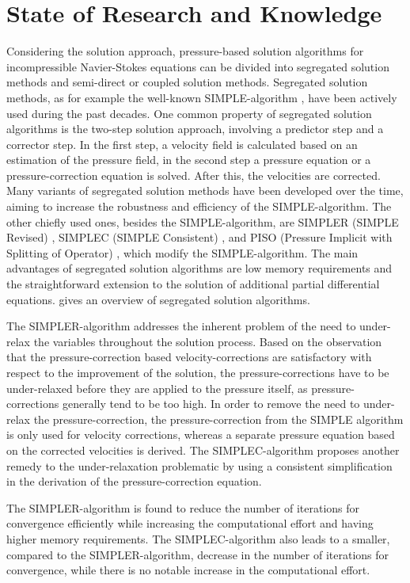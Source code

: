 \section{State of Research and Knowledge}

Considering the solution approach, pressure-based solution algorithms for incompressible Navier-Stokes equations can be divided into segregated solution methods and semi-direct or coupled solution methods. Segregated solution methods, as for example the well-known SIMPLE-algorithm \cite{patankar72}, have been actively used during the past decades. One common property of segregated solution algorithms is the two-step solution approach, involving a predictor step and a corrector step. In the first step, a velocity field is calculated based on an estimation of the pressure field, in the second step a pressure equation or a pressure-correction equation is solved. After this, the velocities are corrected. Many variants of segregated solution methods have been developed over the time, aiming to increase the robustness and efficiency of the SIMPLE-algorithm. The other chiefly used ones, besides the SIMPLE-algorithm, are SIMPLER (SIMPLE Revised) \cite{patankar80}, SIMPLEC (SIMPLE Consistent) \cite{doormaal84}, and PISO (Pressure Implicit with Splitting of Operator) \cite{issa86}, which modify the SIMPLE-algorithm. The main advantages of segregated solution algorithms are low memory requirements and the straightforward extension to the solution of additional partial differential equations.\cite{darwish00} gives an overview of segregated solution algorithms.

The SIMPLER-algorithm addresses the inherent problem of the need to under-relax the variables throughout the solution process. Based on the observation that the pressure-correction based velocity-corrections are satisfactory with respect to the improvement of the solution, the pressure-corrections have to be under-relaxed before they are applied to the pressure itself, as pressure-corrections generally tend to be too high. In order to remove the need to under-relax the pressure-correction, the pressure-correction from the SIMPLE algorithm is only used for velocity corrections, whereas a separate pressure equation based on the corrected velocities is derived. The SIMPLEC-algorithm proposes another remedy to the under-relaxation problematic by using a consistent simplification in the derivation of the pressure-correction equation. 

The SIMPLER-algorithm is found to reduce the number of iterations for convergence efficiently while increasing the computational effort and having higher memory requirements. The SIMPLEC-algorithm also leads to a smaller, compared to the SIMPLER-algorithm, decrease in the number of iterations for convergence, while there is no notable increase in the computational effort. 

